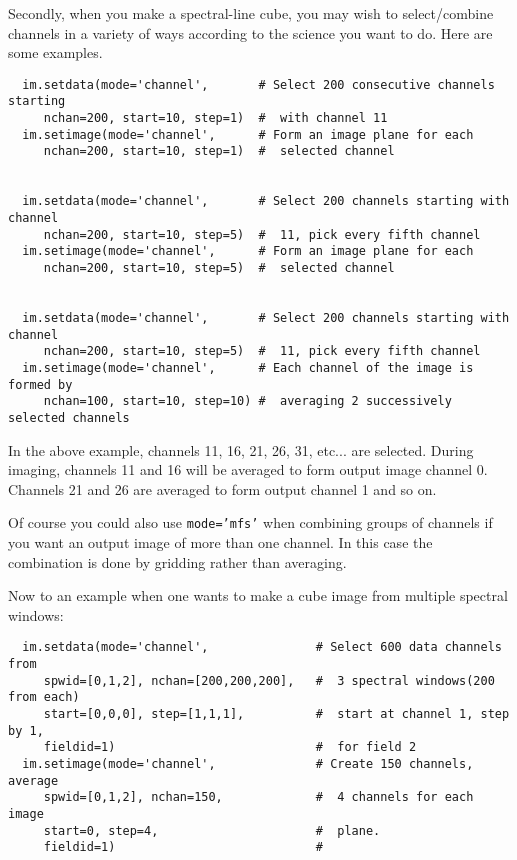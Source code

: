 Secondly, when you make a spectral-line cube, you may wish to
select/combine channels in a variety of ways according to the science
you want to do.  Here are some examples.

\small
\begin{verbatim}
  im.setdata(mode='channel',       # Select 200 consecutive channels starting
     nchan=200, start=10, step=1)  #  with channel 11
  im.setimage(mode='channel',      # Form an image plane for each
     nchan=200, start=10, step=1)  #  selected channel


  im.setdata(mode='channel',       # Select 200 channels starting with channel
     nchan=200, start=10, step=5)  #  11, pick every fifth channel
  im.setimage(mode='channel',      # Form an image plane for each
     nchan=200, start=10, step=5)  #  selected channel


  im.setdata(mode='channel',       # Select 200 channels starting with channel
     nchan=200, start=10, step=5)  #  11, pick every fifth channel
  im.setimage(mode='channel',      # Each channel of the image is formed by
     nchan=100, start=10, step=10) #  averaging 2 successively selected channels
\end{verbatim}
\normalsize


In the above example, channels 11, 16, 21, 26, 31, etc...  are
selected.  During imaging, channels 11 and 16 will be averaged to form
output image channel 0.  Channels 21 and 26 are averaged to form
output channel 1 and so on.

Of course you could also use {\tt mode='mfs'} when combining groups of
channels if you want an output image of more than one channel.  In
this case the combination is done by gridding rather than averaging.

Now to an example when one wants to make a cube image from multiple spectral
windows:

\small
\begin{verbatim}
  im.setdata(mode='channel',               # Select 600 data channels from
     spwid=[0,1,2], nchan=[200,200,200],   #  3 spectral windows(200 from each)
     start=[0,0,0], step=[1,1,1],          #  start at channel 1, step by 1,
     fieldid=1)                            #  for field 2
  im.setimage(mode='channel',              # Create 150 channels, average
     spwid=[0,1,2], nchan=150,             #  4 channels for each image
     start=0, step=4,                      #  plane.
     fieldid=1)                            #
\end{verbatim}
\normalsize


